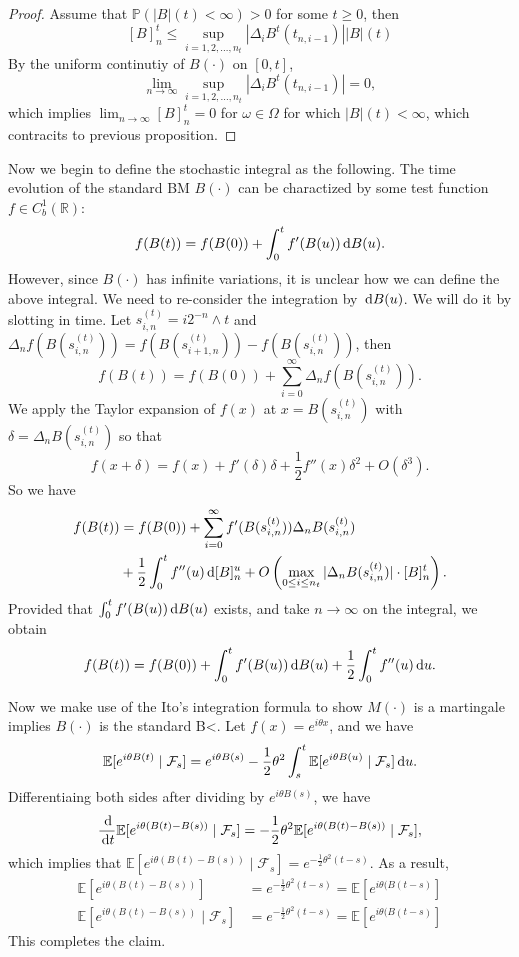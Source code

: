 \begin{proof}
Assume that $\mathbb{P}(|B|(t)<\infty)>0$ for some $t\ge0$, then
\[
[B]_n^t\le \sup_{i=1,2,\ldots,n_t}|\Delta_iB^t(t_{n,i-1})||B|(t)
\]
By the uniform continutiy of $B(\cdot)$ on $[0,t]$,
\[
\lim_{n\to\infty}\sup_{i=1,2,\ldots,n_t}|\Delta_iB^t(t_{n,i-1})|=0,
\]
which implies $\lim_{n\to\infty}[B]_n^t=0$ for $\omega\in\Omega$ for which $|B|(t)<\infty$, which contracits to previous proposition.
\end{proof}

Now we begin to define the stochastic integral as the following.
The time evolution of the standard BM $B(\cdot)$ can be charactized by some test function $f\in C_b^1(\mathbb{R})$:
\[
f(B(t)) = f(B(0)) + \int_0^tf'(B(u))\,\mathrm{d} B(u).
\]
However, since $B(\cdot)$ has infinite variations, it is unclear how we can
define the above integral.
We need to re-consider the integration by $\,\mathrm{d} B(u)$.
We will do it by slotting in time.
Let $s_{i,n}^{(t)}=i2^{-n}\land t$ and $\Delta_nf(B(s_{i,n}^{(t)})) = f(B(s_{i+1,n}^{(t)})) - f(B(s_{i,n}^{(t)}))$, then
\[
f(B(t)) = f(B(0)) + \sum_{i=0}^\infty\Delta_nf(B(s_{i,n}^{(t)})).
\]
We apply the Taylor expansion of $f(x)$ at $x=B(s_{i,n}^{(t)})$ with $\delta = \Delta_nB(s_{i,n}^{(t)})$ so that
\[
f(x+\delta) = f(x) + f'(\delta)\delta + \frac{1}{2}f''(x)\delta^2 + O(\delta^3).
\]
So we have
\begin{align*}
f(B(t)) &= f(B(0)) + \sum_{i=0}^\infty f'(B(s_{i,n}^{(t)}))\Delta_nB(s_{i,n}^{(t)})\\
&+\frac{1}{2}\int_0^tf''(u)\,\mathrm{d}[B]_n^u + O\left(
\max_{0\le i\le n_t}|\Delta_nB(s_{i,n}^{(t)})|\cdot [B]_n^t
\right).
\end{align*}
Provided that $\int_0^tf'(B(u))\,\mathrm{d} B(u)$ exists, and take $n\to\infty$ on the integral, we obtain
\[
f(B(t))=f(B(0)) + \int_0^tf'(B(u))\,\mathrm{d} B(u) + \frac{1}{2}\int_0^tf''(u)\,\mathrm{d} u.
\]

Now we make use of the Ito's integration formula to show $M(\cdot)$ is a martingale implies $B(\cdot)$ is the standard B<.
Let $f(x)=e^{i\theta x}$, and we have
\[
\mathbb{E}[e^{i\theta B(t)}\mid\mathcal{F}_s] = e^{i\theta B(s)} - \frac{1}{2}\theta^2\int_s^t
\mathbb{E}[e^{i\theta B(u)}\mid\mathcal{F}_s]\,\mathrm{d} u.
\] 
Differentiaing both sides after dividing by $e^{i\theta B(s)}$, we have
\[
\frac{\,\mathrm{d}}{\,\mathrm{d} t}\mathbb{E}[e^{i\theta (B(t)-B(s))}\mid\mathcal{F}_s] = 
-\frac{1}{2}\theta^2
\mathbb{E}[e^{i\theta (B(t)-B(s))}\mid\mathcal{F}_s],
\]
which implies that
$\mathbb{E}[e^{i\theta (B(t)-B(s))}\mid\mathcal{F}_s]=e^{-\frac{1}{2}\theta^2(t-s)}$.
As a result,
\begin{align*}
\mathbb{E}[e^{i\theta (B(t) - B(s))}]&=e^{-\frac{1}{2}\theta^2(t-s)}
=\mathbb{E}[e^{i\theta (B(t-s) }]\\
\mathbb{E}[e^{i\theta (B(t) - B(s))}\mid\mathcal{F}_s]&=
e^{-\frac{1}{2}\theta^2(t-s)}
=\mathbb{E}[e^{i\theta (B(t-s) }]
\end{align*}
This completes the claim.

